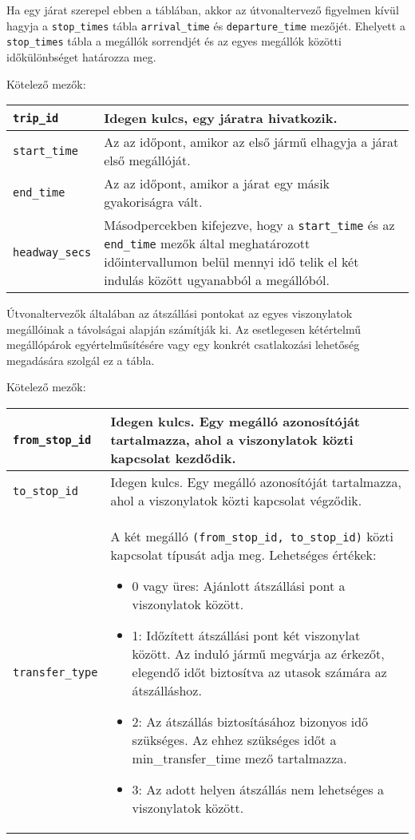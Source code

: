 
Ha egy járat szerepel ebben a táblában, akkor az útvonaltervező figyelmen kívül hagyja a \texttt{stop\_times} tábla \texttt{arrival\_time} és \texttt{departure\_time} mezőjét. Ehelyett a \texttt{stop\_times} tábla a megállók sorrendjét és az egyes megállók közötti időkülönbséget határozza meg.

\medskip

\noindent Kötelező mezők:

\bigskip

\begin{tabular}{|p{3cm}|p{10cm}|}
\hline
\texttt{trip\_id} & Idegen kulcs, egy járatra hivatkozik. \\
\hline
\texttt{start\_time} & Az az időpont, amikor az első jármű elhagyja a járat első megállóját. \\
\hline
\texttt{end\_time} & Az az időpont, amikor a járat egy másik gyakoriságra vált. \\
\hline
\texttt{headway\_secs} & Másodpercekben kifejezve, hogy a \texttt{start\_time} és az \texttt{end\_time} mezők által meghatározott időintervallumon belül mennyi idő telik el két indulás között ugyanabból a megállóból. \\
\hline
\end{tabular}


Útvonaltervezők általában az átszállási pontokat az egyes viszonylatok megállóinak a távolságai alapján számítják ki. Az esetlegesen kétértelmű megállópárok egyértelműsítésére vagy egy konkrét csatlakozási lehetőség megadására szolgál ez a tábla.

\medskip

\noindent Kötelező mezők:

\bigskip

\begin{tabular}{|p{3cm}|p{10cm}|}
\hline
\texttt{from\_stop\_id} & Idegen kulcs. Egy megálló azonosítóját tartalmazza, ahol a viszonylatok közti kapcsolat kezdődik.  \\
\hline
\texttt{to\_stop\_id} & Idegen kulcs. Egy megálló azonosítóját tartalmazza, ahol a viszonylatok közti kapcsolat végződik. \\
\hline
\texttt{transfer\_type} & A két megálló \texttt{(from\_stop\_id, to\_stop\_id)} közti kapcsolat típusát adja meg.
Lehetséges értékek:
\begin{itemize}
\item 0 vagy üres: Ajánlott átszállási pont a viszonylatok között.
\item 1: Időzített átszállási pont két viszonylat között. Az induló jármű megvárja az érkezőt, elegendő időt biztosítva az utasok számára az átszálláshoz.
\item 2: Az átszállás biztosításához bizonyos idő szükséges. Az ehhez szükséges időt a min\_transfer\_time mező tartalmazza.
\item 3: Az adott helyen átszállás nem lehetséges a viszonylatok között.
\end{itemize}
\\
\hline
\end{tabular}

